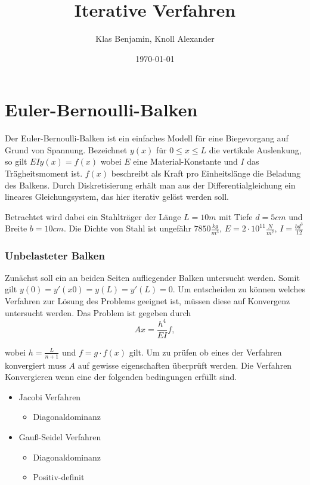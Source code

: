 \documentclass[12pt,titlepage]{article}
\author{Klas Benjamin, Knoll Alexander }
\title{Iterative Verfahren}
\date{\today}
\begin{document}
\maketitle

\part*{Euler-Bernoulli-Balken}

	Der Euler-Bernoulli-Balken ist ein einfaches Modell für eine Biegevorgang auf Grund von
	Spannung. Bezeichnet $y(x)$ für $0 ≤ x ≤ L$ die vertikale Auslenkung, so gilt
	$EIy (x) = f (x)$ wobei $E$ eine Material-Konstante und $I$ das Trägheitsmoment ist. 
	$f(x)$ beschreibt als Kraft pro Einheitslänge die Beladung des Balkens. Durch Diskretisierung erhält man aus der Differentialgleichung ein lineares Gleichungsystem, das hier iterativ gelöst werden soll.
	
	Betrachtet wird dabei ein Stahlträger der Länge $L = 10m$ mit Tiefe $d = 5cm$ und Breite $b = 10cm$. Die Dichte von Stahl ist ungefähr $7850 \frac{kg}{m^3}$, 
	$E = 2 \cdot 10^11 \frac{N}{m^2}$, $I = \frac{bd^3}{12}$

\section{Unbelasteter Balken}

	Zunächst soll ein an beiden Seiten aufliegender Balken untersucht werden.
	Somit gilt $y(0) = y'(x0) = y(L) = y'(L) = 0 $.\newline
	Um entscheiden zu können welches Verfahren zur Lösung des Problems geeignet ist, müssen diese auf Konvergenz untersucht werden. Das Problem ist gegeben durch
	\begin{equation}
		Ax = \frac{h^4}{EI}f,
	\end{equation}
	
	wobei $h = \frac{L}{n+1}$ und $f = g \cdot f(x)$ gilt. Um zu prüfen ob eines der Verfahren konvergiert muss $A$ auf gewisse eigenschaften überprüft werden. Die Verfahren Konvergieren wenn eine der folgenden bedingungen erfüllt sind.
	
	\begin{itemize}
		\centering
		\item Jacobi Verfahren
		\begin{itemize}
			\centering	
			\item Diagonaldominanz
		\end{itemize}
		\item Gauß-Seidel Verfahren
		\begin{itemize}
			\centering
			\item Diagonaldominanz
			\item Positiv-definit
		\end{itemize}
	\end{itemize}
	
\end{document}
